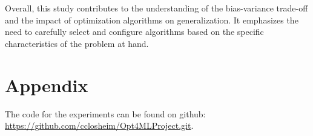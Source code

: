 \documentclass[10pt,conference,compsocconf]{IEEEtran}
\begin{document}
Overall, this study contributes to the understanding of the bias-variance trade-off and the impact of optimization algorithms on generalization. 
It emphasizes the need to carefully select and configure algorithms based on the specific characteristics of the problem at hand.







\section*{Appendix}



The code for the experiments can be found on github: \href{https://github.com/cclosheim/Opt4MLProject.git}{https://github.com/cclosheim/Opt4MLProject.git}.
\end{document}
